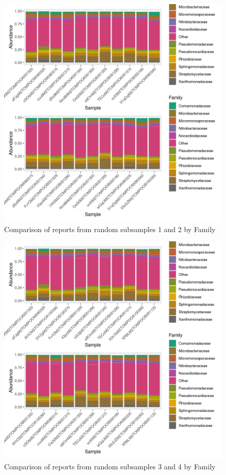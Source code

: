 \documentclass{article}
\begin{document}
\begin{figure}
\centering
\includegraphics[scale=0.8]{tomate_aleatorio1_1.csv_tomate_aleatorio1_2.csv_relative_abundance_Family.png}
\caption{Comparison of reports from random subsamples 1 and 2 by Family}
\end{figure}


\begin{figure}
\centering
\includegraphics[scale=0.8]{tomate_aleatorio1_3.csv_tomate_aleatorio1_4.csv_relative_abundance_Family.png}
\caption{Comparison of reports from random subsamples 3 and 4 by Family}
\end{figure}
\end{document}
